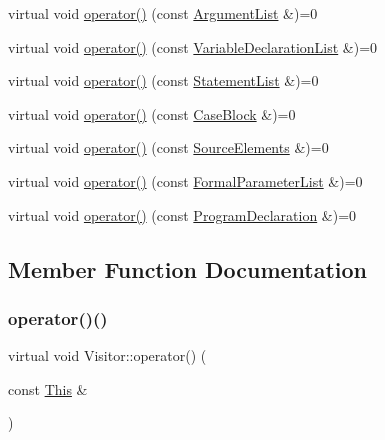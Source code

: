 \begin{DoxyCompactItemize}
\item 
virtual void \hyperlink{struct_visitor_afe0ebb45873b49711e28f543e1be18ab}{operator()} (const \hyperlink{struct_argument_list}{Argument\+List} \&)=0
\item 
virtual void \hyperlink{struct_visitor_af12d0fa756687bf6e54263bf65832663}{operator()} (const \hyperlink{struct_variable_declaration_list}{Variable\+Declaration\+List} \&)=0
\item 
virtual void \hyperlink{struct_visitor_a36ea2fb9b8225f7b4c04c3d546c4608a}{operator()} (const \hyperlink{struct_statement_list}{Statement\+List} \&)=0
\item 
virtual void \hyperlink{struct_visitor_a6042d08a4d52ec6d3cd76251c88c5202}{operator()} (const \hyperlink{struct_case_block}{Case\+Block} \&)=0
\item 
virtual void \hyperlink{struct_visitor_ad9a1464cbbd0ab4e528ac4d22c056647}{operator()} (const \hyperlink{struct_source_elements}{Source\+Elements} \&)=0
\item 
virtual void \hyperlink{struct_visitor_a1481a506dd79cc99d06ea9ebd2ac08ad}{operator()} (const \hyperlink{struct_formal_parameter_list}{Formal\+Parameter\+List} \&)=0
\item 
virtual void \hyperlink{struct_visitor_ab6afd14c23c1fa6f01d24e2593ac91bf}{operator()} (const \hyperlink{struct_program_declaration}{Program\+Declaration} \&)=0
\end{DoxyCompactItemize}


\subsection{Member Function Documentation}
\mbox{\label{struct_visitor_a7a043c9da4e7f8233db48afb82dbc7bc}} 
\subsubsection{\texorpdfstring{operator()()}{operator()()}\hspace{0.1cm}{\footnotesize\ttfamily [1/59]}}
{\footnotesize\ttfamily virtual void Visitor\+::operator() (\begin{DoxyParamCaption}\item[{const \hyperlink{struct_this}{This} \&}]{ }\end{DoxyParamCaption})\hspace{0.3cm}{\ttfamily [pure virtual]}}



